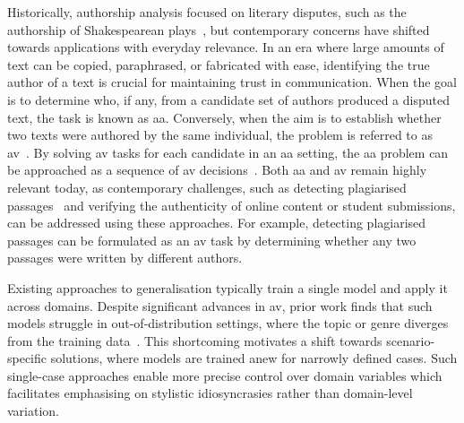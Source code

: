 Historically, authorship analysis focused on literary disputes, such as the authorship of Shakespearean plays~\citep{neal_surveying_2018,stamatatos_survey_2009}, but contemporary concerns have shifted towards applications with everyday relevance.
In an era where large amounts of text can be copied, paraphrased, or fabricated with ease, identifying the true author of a text is crucial for maintaining trust in communication. 
%
When the goal is to determine who, if any, from a candidate set of authors produced a disputed text, the task is known as \ac{aa}. 
Conversely, when the aim is to establish whether two texts were authored by the same individual, the problem is referred to as \ac{av}~\citep{koppel_authorship_2004}. 
By solving \ac{av} tasks for each candidate in an \ac{aa} setting, the \ac{aa} problem can be approached as a sequence of \ac{av} decisions~\citep{tyo_state_2022,barlas_cross_domain_2020}.
%
Both \ac{aa} and \ac{av} remain highly relevant today, as contemporary challenges, such as detecting plagiarised passages~\citep{stein_intrinsic_2011} and verifying the authenticity of online content or student submissions, can be addressed using these approaches. 
For example, detecting plagiarised passages can be formulated as an \ac{av} task by determining whether any two passages were written by different authors.



Existing approaches to generalisation typically train a single model and apply it across domains.
Despite significant advances in \ac{av}, prior work finds that such models struggle in out-of-distribution settings, where the topic or genre diverges from the training data~\citep{Sundararajan_style_18,bischoff_importance_2020,li_learning_2025}. 
This shortcoming motivates a shift towards scenario-specific solutions, where models are trained anew for narrowly defined cases. 
Such single-case approaches enable more precise control over domain variables which facilitates emphasising on stylistic idiosyncrasies rather than domain-level variation.

